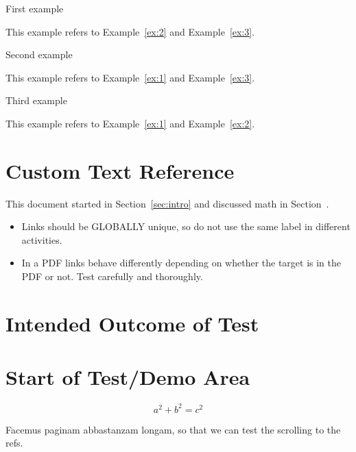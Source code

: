 \documentclass{ximera}
\begin{document}
\begin{example} \label{ex:1}
 First example  

 This example refers to Example~\ref{ex:2} and Example~\ref{ex:3}.

\end{example}
\begin{example} \label{ex:2}
 Second example  

  This example refers to Example~\ref{ex:1} and Example~\ref{ex:3}.
\end{example}
\begin{example} \label{ex:3}
 Third example  

  This example refers to Example~\ref{ex:1} and Example~\ref{ex:2}.
\end{example}


\section{Custom Text Reference}

This document started in Section~\ref{sec:intro} and discussed math in Section~.


\begin{remark}

    \begin{itemize}
        \item  Links should be GLOBALLY unique, so do not use the same label in different activities.
        \item  In a PDF links behave differently depending on whether the target is in the PDF or not. 
            Test carefully and thoroughly.
    \end{itemize}
\end{remark}


\section{Intended Outcome of Test}


\section{Start of Test/Demo Area}

\begin{equation}
a^2 + b^2 = c^2    \label{eq:pyth}
\end{equation}

Facemus paginam abbastanzam longam, so that we can test the scrolling to the refs.

\lipsum[1]

\lipsum[2]

\lipsum[3]

\lipsum[4]

\hrulefill
\end{document}
